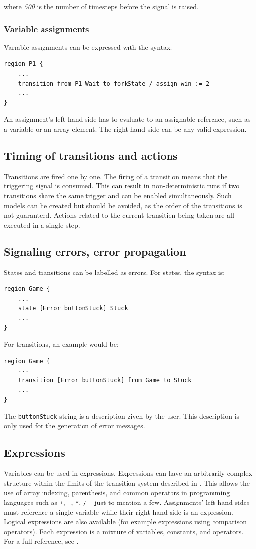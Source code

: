 where \textit{500} is the number of timesteps before the signal is raised.
  \subsubsection{Variable assignments}
Variable assignments can be expressed with the syntax:

\begin{lstlisting}
region P1 {
	...
	transition from P1_Wait to forkState / assign win := 2
	...
}
\end{lstlisting}

An assignment's left hand side has to evaluate to an assignable reference, such as a variable or an array element. The right hand side can be any valid expression.
  \subsection{Timing of transitions and actions}
Transitions are fired one by one. The firing of a transition means that the triggering signal is consumed. This can result in non-deterministic runs if two transitions share the same trigger and can be enabled simultaneously. Such models can be created but should be avoided, as the order of the transitions is not guaranteed. Actions related to the current transition being taken are all executed in a single step.
  \subsection{Signaling errors, error propagation}
States and transitions can be labelled as errors. For states, the syntax is:

\begin{lstlisting}
region Game {
	...
	state [Error buttonStuck] Stuck
	...
}
\end{lstlisting}

For transitions, an example would be:

\begin{lstlisting}
region Game {
	...
	transition [Error buttonStuck] from Game to Stuck
	...
}
\end{lstlisting}

The \verb!buttonStuck! string is a description given by the user. This description is only used for the generation of error messages.
  \subsection{Expressions}
Variables can be used in expressions. Expressions can have an arbitrarily complex structure within the limits of the transition system described in \citep{fapts}. This allows the use of array indexing, parenthesis, and common operators in programming languages such as \verb!+!, \verb!-!, \verb!*!, \verb!/! --  just to mention a few. Assignments' left hand sides must reference a single variable while their right hand side is an expression. Logical expressions are also available (for example expressions using comparison operators). Each expression is a mixture of variables, constants, and operators. For a full reference, see \citep{fapts}.
